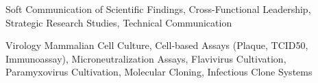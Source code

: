 

\begin{cvskills}

  \vspace{-4.0mm}
  
    \cvskill
    {Soft} %
    {Communication of Scientific Findings, Cross-Functional Leadership, Strategic Research Studies, Technical Communication} \\%
      \vspace{-4.0mm}
  
  \cvskill
    {Virology} %
    {Mammalian Cell Culture, Cell-based Assays (Plaque, TCID50, Immunoassay), Microneutralization Assays, Flavivirus Cultivation, Paramyxovirus Cultivation, Molecular Cloning, Infectious Clone Systems} \\%
      \vspace{-4.0mm}
      

\end{cvskills}
